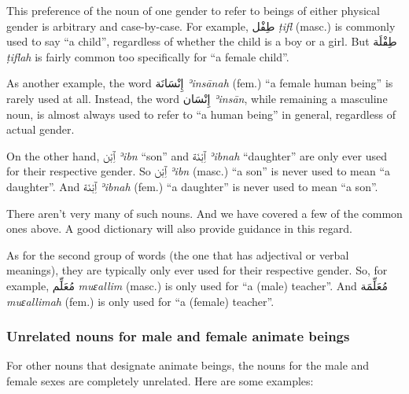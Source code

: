 \documentclass[
  10pt,
]{book}
\begin{document}
This preference of the noun of one gender to refer to beings of either physical gender is arbitrary and case-by-case. For example,
\foreignlanguage{arabic}{طِفْل} \emph{ṭifl} (masc.) is commonly used to say \enquote{a child}, regardless of whether the child is a boy or a girl. But \foreignlanguage{arabic}{طِفْلَة} \emph{ṭiflah} is fairly common too specifically for \enquote{a female child}.

As another example, the word \foreignlanguage{arabic}{إِنْسَانَة} \emph{ʾinsānah} (fem.) \enquote{a female human being} is rarely used at all. Instead, the word
\foreignlanguage{arabic}{إِنْسَان} \emph{ʾinsān}, while remaining a masculine noun, is almost always used to refer to \enquote{a human being} in general, regardless of actual gender.

On the other hand,
\foreignlanguage{arabic}{ٱِبْن} \emph{ʾibn} \enquote{son} and
\foreignlanguage{arabic}{ٱِبْنَة} \emph{ʾibnah} \enquote{daughter}
are only ever used for their respective gender. So
\foreignlanguage{arabic}{ٱِبْن} \emph{ʾibn} (masc.) \enquote{a son} is never used to mean \enquote{a daughter}.
And \foreignlanguage{arabic}{ٱِبْنَة} \emph{ʾibnah} (fem.) \enquote{a daughter} is never used to mean \enquote{a son}.

There aren't very many of such nouns. And we have covered a few of the common ones above. A good dictionary will also provide guidance in this regard.

As for the second group of words (the one that has adjectival or verbal meanings), they are typically only ever used for their respective gender. So, for example,
\foreignlanguage{arabic}{مُعَلِّم} \emph{muɛallim} (masc.) is only used for \enquote{a (male) teacher}. And
\foreignlanguage{arabic}{مُعَلِّمَة} \emph{muɛallimah} (fem.) is only used for \enquote{a (female) teacher}.

\subsubsection{Unrelated nouns for male and female animate beings}\label{unrelated-nouns-for-male-and-female-animate-beings}

For other nouns that designate animate beings, the nouns for the male and female sexes are completely unrelated. Here are some examples:
\end{document}
